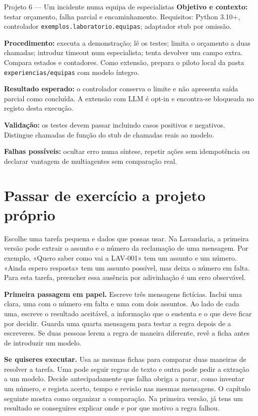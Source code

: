 \begin{promptlabbox}{Projeto 6 — Um incidente numa equipa de especialistas}
\textbf{Objetivo e contexto:} testar orçamento, falha parcial e encaminhamento. Requisitos: Python 3.10+, controlador \texttt{exemplos.laboratorio.equipas}; adaptador stub por omissão.

\textbf{Procedimento:} executa a demonstração; lê os testes; limita o orçamento a duas chamadas; introduz timeout num especialista; tenta devolver um campo extra. Compara estados e contadores. Como extensão, prepara o piloto local da pasta \texttt{experiencias/equipas} com modelo íntegro.

\textbf{Resultado esperado:} o controlador conserva o limite e não apresenta saída parcial como concluída. A extensão com LLM é opt-in e encontra-se bloqueada no registo desta execução.

\textbf{Validação:} os testes devem passar incluindo casos positivos e negativos. Distingue chamadas de função do stub de chamadas reais ao modelo.

\textbf{Falhas possíveis:} ocultar erro numa síntese, repetir ações sem idempotência ou declarar vantagem de multiagentes sem comparação real.
\end{promptlabbox}

\section{Passar de exercício a projeto próprio}
Escolhe uma tarefa pequena e dados que possas usar. Na Lavandaria, a primeira versão pode extrair o assunto e o número da reclamação de uma mensagem. Por exemplo, «Quero saber como vai a LAV-001» tem um assunto e um número. «Ainda espero resposta» tem um assunto possível, mas deixa o número em falta. Para esta tarefa, preencher essa ausência por adivinhação é um erro observável.

\textbf{Primeira passagem em papel.} Escreve três mensagens fictícias. Inclui uma clara, uma com o número em falta e uma com dois assuntos. Ao lado de cada uma, escreve o resultado aceitável, a informação que o sustenta e o que deve ficar por decidir. Guarda uma quarta mensagem para testar a regra depois de a escreveres. Se duas pessoas lerem a regra de maneira diferente, revê a ficha antes de introduzir um modelo.

\textbf{Se quiseres executar.} Usa as mesmas fichas para comparar duas maneiras de resolver a tarefa. Uma pode seguir regras de texto e outra pode pedir a extração a um modelo. Decide antecipadamente que falha obriga a parar, como inventar um número, e regista acerto, tempo e revisão nas mesmas mensagens. O capítulo seguinte mostra como organizar a comparação. Na primeira versão, já tens um resultado se conseguires explicar onde e por que motivo a regra falhou.
